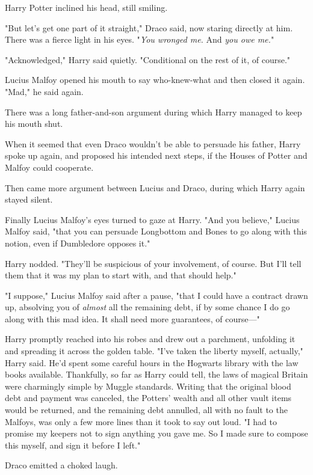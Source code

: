 Harry Potter inclined his head, still smiling.

"But let's get one part of it straight," Draco said, now staring directly at
him. There was a fierce light in his eyes. "\emph{You wronged me.} And
\emph{you owe me.}"

"Acknowledged," Harry said quietly. "Conditional on the rest of it, of course."

Lucius Malfoy opened his mouth to say who-knew-what and then closed it again.
"Mad," he said again.

There was a long father-and-son argument during which Harry managed to keep his
mouth shut.

When it seemed that even Draco wouldn't be able to persuade his father, Harry
spoke up again, and proposed his intended next steps, if the Houses of Potter
and Malfoy could cooperate.

Then came more argument between Lucius and Draco, during which Harry again
stayed silent.

Finally Lucius Malfoy's eyes turned to gaze at Harry. "And you believe," Lucius
Malfoy said, "that you can persuade Longbottom and Bones to go along with this
notion, even if Dumbledore opposes it."

Harry nodded. "They'll be suspicious of your involvement, of course. But I'll
tell them that it was my plan to start with, and that should help."

"I suppose," Lucius Malfoy said after a pause, "that I could have a contract
drawn up, absolving you of \emph{almost} all the remaining debt, if by some
chance I do go along with this mad idea. It shall need more guarantees, of
course\mbox{---}"

Harry promptly reached into his robes and drew out a parchment, unfolding it
and spreading it across the golden table. "I've taken the liberty myself,
actually," Harry said. He'd spent some careful hours in the Hogwarts library
with the law books available. Thankfully, so far as Harry could tell, the laws
of magical Britain were charmingly simple by Muggle standards. Writing that the
original blood debt and payment was canceled, the Potters' wealth and all
other vault items would be returned, and the remaining debt annulled, all with
no fault to the Malfoys, was only a few more lines than it took to say out
loud. "I had to promise my keepers not to sign anything you gave me. So I made
sure to compose this myself, and sign it before I left."

Draco emitted a choked laugh.

